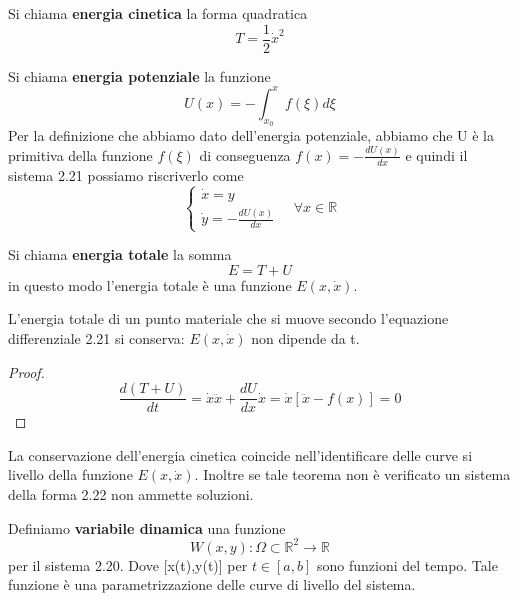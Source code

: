 Si chiama \textbf{energia cinetica} la forma quadratica 
\begin{equation*}
	T = \frac{1}{2} \dot{x}^2
\end{equation*}

Si chiama \textbf{energia potenziale} la funzione 
\begin{equation*}
	U(x) = - \int_{x_0}^{x} f(\xi) d \xi
\end{equation*} 
Per la definizione che abbiamo dato dell'energia potenziale, abbiamo che U \`{e} la primitiva della funzione $f(\xi)$  di conseguenza $f(x) = - \frac{dU(x)}{dx}$ e quindi il sistema 2.21 possiamo riscriverlo come
\begin{equation}
		\left \{ \begin{array}{l}
		\dot{x} = y \\
		\dot{y} = - \frac{dU(x)}{dx}
	\end{array} \right.  \quad \forall x \in \mathbb{R}
\end{equation}

Si chiama \textbf{energia totale} la somma 
\begin{equation*}
	E = T + U
\end{equation*}
in questo modo l'energia totale \`{e} una funzione $E(x,\dot{x})$.

\begin{theorem} L'energia totale di un punto materiale che si muove secondo l'equazione differenziale 2.21 si conserva: $ E(x,\dot{x}) $ non dipende da t.	
\end{theorem}

\begin{proof}
\begin{equation*}
	\frac{d (T+U)}{dt} = \dot{x} \ddot{x} + \frac{dU}{dx}\dot{x} = \dot{x}[\ddot{x} - f(x)] = 0 
\end{equation*}
\end{proof}

\noindent La conservazione dell'energia cinetica coincide nell'identificare delle curve si livello della funzione $E(x,\dot{x})$. Inoltre se tale teorema non \`{e} verificato un sistema della forma 2.22 non ammette soluzioni.

\begin{definition}
	Definiamo \textbf{variabile dinamica} una funzione
	\begin{equation*}
		W(x,y) : \Omega \subset \mathbb{R}^2 \rightarrow \mathbb{R}
	\end{equation*}
	per il sistema 2.20. Dove [x(t),y(t)] per $t \in [a,b]$ sono funzioni del tempo. Tale funzione \`{e} una parametrizzazione delle curve di livello del sistema.
\end{definition}

